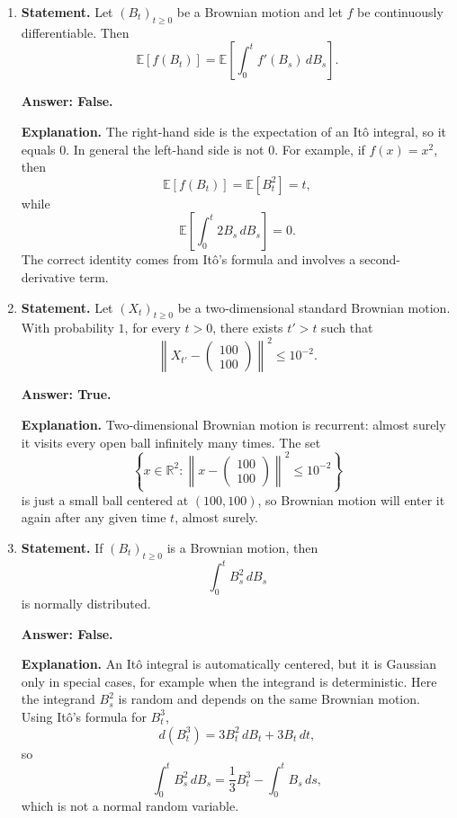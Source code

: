 \documentclass[11pt]{article}
\theoremstyle{definition}
\begin{document}
\begin{enumerate}[label=(\arabic*)]
\textbf{Answer: True.}

\textbf{Explanation.}
Brownian motion starts at \(0\), and with probability \(1\) it returns to \(0\) arbitrarily soon after time \(0\). Therefore the first strictly positive return time has infimum \(0\), so \(T=0\) almost surely.

\item \textbf{Statement.} Let \((B_t)_{t\ge 0}\) be a Brownian motion and let \(f\) be continuously differentiable. Then
\[
\mathbb E[f(B_t)]
=
\mathbb E\!\left[\int_0^t f'(B_s)\,dB_s\right].
\]

\textbf{Answer: False.}

\textbf{Explanation.}
The right-hand side is the expectation of an It\^o integral, so it equals \(0\). In general the left-hand side is not \(0\). For example, if \(f(x)=x^2\), then
\[
\mathbb E[f(B_t)]=\mathbb E[B_t^2]=t,
\]
while
\[
\mathbb E\!\left[\int_0^t 2B_s\,dB_s\right]=0.
\]
The correct identity comes from It\^o's formula and involves a second-derivative term.

\item \textbf{Statement.} Let \((X_t)_{t\ge 0}\) be a two-dimensional standard Brownian motion. With probability \(1\), for every \(t>0\), there exists \(t'>t\) such that
\[
\left\|X_{t'}-\begin{pmatrix}100\\100\end{pmatrix}\right\|^2\le 10^{-2}.
\]

\textbf{Answer: True.}

\textbf{Explanation.}
Two-dimensional Brownian motion is recurrent: almost surely it visits every open ball infinitely many times. The set
\[
\left\{x\in \mathbb R^2:\left\|x-\begin{pmatrix}100\\100\end{pmatrix}\right\|^2\le 10^{-2}\right\}
\]
is just a small ball centered at \((100,100)\), so Brownian motion will enter it again after any given time \(t\), almost surely.

\item \textbf{Statement.} If \((B_t)_{t\ge 0}\) is a Brownian motion, then
\[
\int_0^t B_s^2\,dB_s
\]
is normally distributed.

\textbf{Answer: False.}

\textbf{Explanation.}
An It\^o integral is automatically centered, but it is Gaussian only in special cases, for example when the integrand is deterministic. Here the integrand \(B_s^2\) is random and depends on the same Brownian motion.
Using It\^o's formula for \(B_t^3\),
\[
d(B_t^3)=3B_t^2\,dB_t+3B_t\,dt,
\]
so
\[
\int_0^t B_s^2\,dB_s
=
\frac13 B_t^3-\int_0^t B_s\,ds,
\]
which is not a normal random variable.
\end{enumerate}
\end{document}
